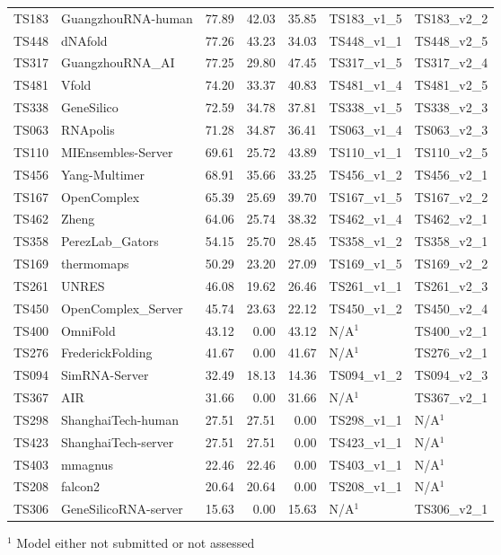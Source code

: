 \begin{table}[ht]
{\begin{tabular}{llrrrll}
TS183 & GuangzhouRNA-human & 77.89 & 42.03 & 35.85 & TS183\_v1\_5 & TS183\_v2\_2 \\ 
TS448 & dNAfold & 77.26 & 43.23 & 34.03 & TS448\_v1\_1 & TS448\_v2\_5 \\ 
TS317 & GuangzhouRNA\_AI & 77.25 & 29.80 & 47.45 & TS317\_v1\_5 & TS317\_v2\_4 \\ 
TS481 & Vfold & 74.20 & 33.37 & 40.83 & TS481\_v1\_4 & TS481\_v2\_5 \\ 
TS338 & GeneSilico & 72.59 & 34.78 & 37.81 & TS338\_v1\_5 & TS338\_v2\_3 \\ 
TS063 & RNApolis & 71.28 & 34.87 & 36.41 & TS063\_v1\_4 & TS063\_v2\_3 \\ 
TS110 & MIEnsembles-Server & 69.61 & 25.72 & 43.89 & TS110\_v1\_1 & TS110\_v2\_5 \\ 
TS456 & Yang-Multimer & 68.91 & 35.66 & 33.25 & TS456\_v1\_2 & TS456\_v2\_1 \\ 
TS167 & OpenComplex & 65.39 & 25.69 & 39.70 & TS167\_v1\_5 & TS167\_v2\_2 \\ 
TS462 & Zheng & 64.06 & 25.74 & 38.32 & TS462\_v1\_4 & TS462\_v2\_1 \\ 
TS358 & PerezLab\_Gators & 54.15 & 25.70 & 28.45 & TS358\_v1\_2 & TS358\_v2\_1 \\ 
TS169 & thermomaps & 50.29 & 23.20 & 27.09 & TS169\_v1\_5 & TS169\_v2\_2 \\ 
TS261 & UNRES & 46.08 & 19.62 & 26.46 & TS261\_v1\_1 & TS261\_v2\_3 \\ 
TS450 & OpenComplex\_Server & 45.74 & 23.63 & 22.12 & TS450\_v1\_2 & TS450\_v2\_4 \\ 
TS400 & OmniFold & 43.12 & 0.00 & 43.12 & N/A$^{1}$ & TS400\_v2\_1 \\ 
TS276 & FrederickFolding & 41.67 & 0.00 & 41.67 & N/A$^{1}$ & TS276\_v2\_1 \\ 
TS094 & SimRNA-Server & 32.49 & 18.13 & 14.36 & TS094\_v1\_2 & TS094\_v2\_3 \\ 
TS367 & AIR & 31.66 & 0.00 & 31.66 & N/A$^{1}$ & TS367\_v2\_1 \\ 
TS298 & ShanghaiTech-human & 27.51 & 27.51 & 0.00 & TS298\_v1\_1 & N/A$^{1}$ \\ 
TS423 & ShanghaiTech-server & 27.51 & 27.51 & 0.00 & TS423\_v1\_1 & N/A$^{1}$ \\ 
TS403 & mmagnus & 22.46 & 22.46 & 0.00 & TS403\_v1\_1 & N/A$^{1}$ \\ 
TS208 & falcon2 & 20.64 & 20.64 & 0.00 & TS208\_v1\_1 & N/A$^{1}$ \\ 
TS306 & GeneSilicoRNA-server & 15.63 & 0.00 & 15.63 & N/A$^{1}$ & TS306\_v2\_1 \\ 
\bottomrule
\end{tabular}%
}
\begin{flushleft}\footnotesize $^{1}$ Model either not submitted or not assessed\end{flushleft}
\end{table}
